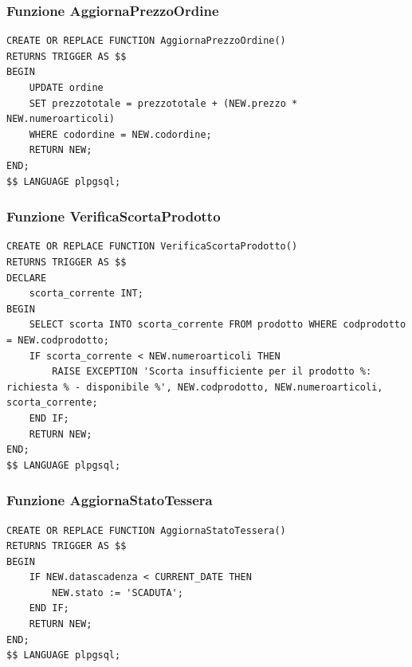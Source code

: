 \documentclass[a4paper,12pt]{article}
\begin{document}
\subsubsection*{Funzione AggiornaPrezzoOrdine}
\vspace{1.5em}
\begin{lstlisting}[style=sqlstyle]
CREATE OR REPLACE FUNCTION AggiornaPrezzoOrdine()
RETURNS TRIGGER AS $$
BEGIN
    UPDATE ordine
    SET prezzototale = prezzototale + (NEW.prezzo * NEW.numeroarticoli)
    WHERE codordine = NEW.codordine;
    RETURN NEW;
END;
$$ LANGUAGE plpgsql;
\end{lstlisting}
\vspace{1.5em}

\subsubsection*{Funzione VerificaScortaProdotto}
\vspace{1.5em}
\begin{lstlisting}[style=sqlstyle]
CREATE OR REPLACE FUNCTION VerificaScortaProdotto()
RETURNS TRIGGER AS $$
DECLARE
    scorta_corrente INT;
BEGIN
    SELECT scorta INTO scorta_corrente FROM prodotto WHERE codprodotto = NEW.codprodotto;
    IF scorta_corrente < NEW.numeroarticoli THEN
        RAISE EXCEPTION 'Scorta insufficiente per il prodotto %: richiesta % - disponibile %', NEW.codprodotto, NEW.numeroarticoli, scorta_corrente;
    END IF;
    RETURN NEW;
END;
$$ LANGUAGE plpgsql;
\end{lstlisting}
\vspace{1.5em}

\subsubsection*{Funzione AggiornaStatoTessera}
\vspace{1.5em}
\begin{lstlisting}[style=sqlstyle]
CREATE OR REPLACE FUNCTION AggiornaStatoTessera()
RETURNS TRIGGER AS $$
BEGIN
    IF NEW.datascadenza < CURRENT_DATE THEN
        NEW.stato := 'SCADUTA';
    END IF;
    RETURN NEW;
END;
$$ LANGUAGE plpgsql;
\end{lstlisting}
\vspace{1.5em}
\end{document}
